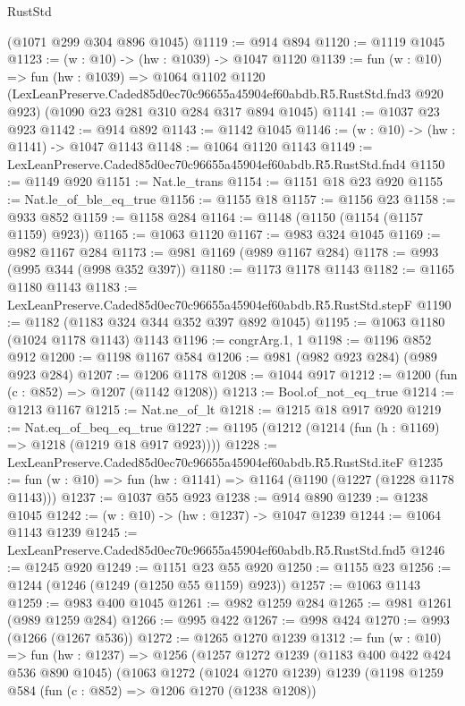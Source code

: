 \begin{lexlean}{RustStd}
\begin{coremodule}
    (@1071 @299 @304 @896 @1045)
@1119 := @914 @894
@1120 := @1119 @1045
@1123 := (w : @10) -> (hw : @1039) -> @1047 @1120
@1139 := fun (w : @10) =>
  fun (hw : @1039) =>
  @1064
    @1102
    @1120
    (LexLeanPreserve.Caded85d0ec70c96655a45904ef60abdb.R5.RustStd.fnd3 @920 @923)
    (@1090 @23 @281 @310 @284 @317 @894 @1045)
@1141 := @1037 @23 @923
@1142 := @914 @892
@1143 := @1142 @1045
@1146 := (w : @10) -> (hw : @1141) -> @1047 @1143
@1148 := @1064 @1120 @1143
@1149 := LexLeanPreserve.Caded85d0ec70c96655a45904ef60abdb.R5.RustStd.fnd4
@1150 := @1149 @920
@1151 := Nat.le_trans
@1154 := @1151 @18 @23 @920
@1155 := Nat.le_of_ble_eq_true
@1156 := @1155 @18
@1157 := @1156 @23
@1158 := @933 @852
@1159 := @1158 @284
@1164 := @1148 (@1150 (@1154 (@1157 @1159) @923))
@1165 := @1063 @1120
@1167 := @983 @324 @1045
@1169 := @982 @1167 @284
@1173 := @981 @1169 (@989 @1167 @284)
@1178 := @993 (@995 @344 (@998 @352 @397))
@1180 := @1173 @1178 @1143
@1182 := @1165 @1180 @1143
@1183 := LexLeanPreserve.Caded85d0ec70c96655a45904ef60abdb.R5.RustStd.stepF
@1190 := @1182 (@1183 @324 @344 @352 @397 @892 @1045)
@1195 := @1063 @1180 (@1024 @1178 @1143) @1143
@1196 := congrArg.{1, 1}
@1198 := @1196 @852 @912
@1200 := @1198 @1167 @584
@1206 := @981 (@982 @923 @284) (@989 @923 @284)
@1207 := @1206 @1178
@1208 := @1044 @917
@1212 := @1200 (fun (c : @852) => @1207 (@1142 @1208))
@1213 := Bool.of_not_eq_true
@1214 := @1213 @1167
@1215 := Nat.ne_of_lt
@1218 := @1215 @18 @917 @920
@1219 := Nat.eq_of_beq_eq_true
@1227 := @1195 (@1212 (@1214 (fun (h : @1169) => @1218 (@1219 @18 @917 @923))))
@1228 := LexLeanPreserve.Caded85d0ec70c96655a45904ef60abdb.R5.RustStd.iteF
@1235 := fun (w : @10) => fun (hw : @1141) => @1164 (@1190 (@1227 (@1228 @1178 @1143)))
@1237 := @1037 @55 @923
@1238 := @914 @890
@1239 := @1238 @1045
@1242 := (w : @10) -> (hw : @1237) -> @1047 @1239
@1244 := @1064 @1143 @1239
@1245 := LexLeanPreserve.Caded85d0ec70c96655a45904ef60abdb.R5.RustStd.fnd5
@1246 := @1245 @920
@1249 := @1151 @23 @55 @920
@1250 := @1155 @23
@1256 := @1244 (@1246 (@1249 (@1250 @55 @1159) @923))
@1257 := @1063 @1143
@1259 := @983 @400 @1045
@1261 := @982 @1259 @284
@1265 := @981 @1261 (@989 @1259 @284)
@1266 := @995 @422
@1267 := @998 @424
@1270 := @993 (@1266 (@1267 @536))
@1272 := @1265 @1270 @1239
@1312 := fun (w : @10) =>
  fun (hw : @1237) =>
  @1256
    (@1257
      @1272
      @1239
      (@1183 @400 @422 @424 @536 @890 @1045)
      (@1063
        @1272
        (@1024 @1270 @1239)
        @1239
        (@1198
          @1259
          @584
          (fun (c : @852) => @1206 @1270 (@1238 @1208))

\end{coremodule}
\end{lexlean}
